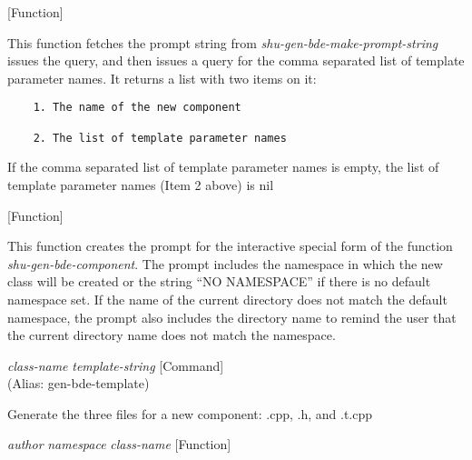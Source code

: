 \vspace{1em}
\noindent
{}
\usebox{\funcname}
 \hfill [Function]

\begin{doc-string}
This function fetches the prompt string from \emph{shu-gen-bde-make-prompt-string}
issues the query, and then issues a query for the comma separated list of
template parameter names.  It returns a list with two items on it:

\small{\begin{verbatim}
    1. The name of the new component

    2. The list of template parameter names
\end{verbatim}}

If the comma separated list of template parameter names is empty, the list of
template parameter names (Item 2 above) is nil
\end{doc-string}

\vspace{1em}
\noindent
{}
\usebox{\funcname}
 \hfill [Function]

\begin{doc-string}
This function creates the prompt for the interactive special form of the
function \emph{shu-gen-bde-component}.  The prompt includes the namespace in which the
new class will be created or the string ``NO NAMESPACE'' if there is no default
namespace set.  If the name of the current directory does not match the default
namespace, the prompt also includes the directory name to remind the user that
the current directory name does not match the namespace.
\end{doc-string}

\vspace{1em}
\noindent
{}
\usebox{\funcname}\emph{class-name} \emph{template-string}
 \hfill [Command]\\%
 (Alias: gen-bde-template)

\begin{doc-string}
Generate the three files for a new component: .cpp, .h, and .t.cpp
\end{doc-string}

\vspace{1em}
\noindent
{}
\usebox{\funcname}\emph{author} \emph{namespace} \emph{class-name}
 \hfill [Function]

